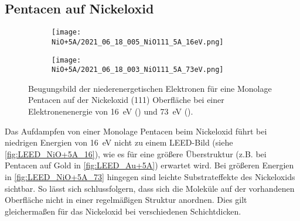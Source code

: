         \subsection{Pentacen auf Nickeloxid}
            \begin{figure}
                \centering
                \begin{subfigure}[t]{0.48\textwidth}
                    \centering
                    \texttt{[image: NiO+5A/2021\_06\_18\_005\_NiO111\_5A\_16eV.png]}
                    \subcaption{}
                    \label{fig:LEED_NiO+5A_16}
                \end{subfigure}
                \begin{subfigure}[t]{0.48\textwidth}
                    \centering
                    \texttt{[image: NiO+5A/2021\_06\_18\_003\_NiO111\_5A\_73eV.png]}
                    \subcaption{}
                    \label{fig:LEED_NiO+5A_73}
                \end{subfigure}
                \caption{Beugungsbild der niederenergetischen Elektronen für eine Monolage Pentacen auf der Nickeloxid (111) Oberfläche bei einer Elektronenenergie von \SI{16}{\electronvolt} () und \SI{73}{\electronvolt} ().}
                \label{fig:LEED_NiO+5A}
            \end{figure}
            Das Aufdampfen von einer Monolage Pentacen beim Nickeloxid führt bei niedrigen Energien von \SI{16}{\electronvolt} nicht zu einem LEED-Bild (siehe \autoref{fig:LEED_NiO+5A_16}), wie es für eine größere Überstruktur (z.B. bei Pentacen auf Gold in \autoref{fig:LEED_Au+5A}) erwartet wird.
            Bei größeren Energien in \autoref{fig:LEED_NiO+5A_73} hingegen sind leichte Substrateffekte des Nickeloxids sichtbar.
            So lässt sich schlussfolgern, dass sich die Moleküle auf der vorhandenen Oberfläche nicht in einer regelmäßigen Struktur anordnen.
            Dies gilt gleichermaßen für das Nickeloxid bei verschiedenen Schichtdicken.

